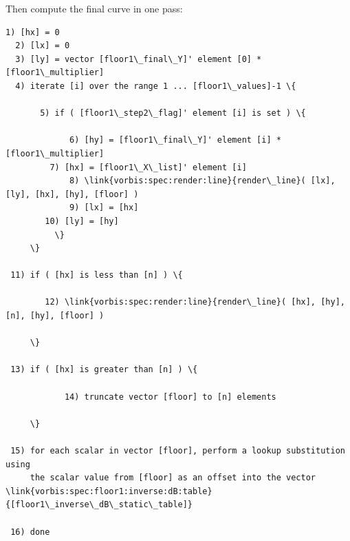 \begin{description}
Then compute the final curve in one pass:

\begin{Verbatim}[commandchars=\\\{\}]
  1) [hx] = 0
  2) [lx] = 0
  3) [ly] = vector [floor1\_final\_Y]' element [0] * [floor1\_multiplier]
  4) iterate [i] over the range 1 ... [floor1\_values]-1 \{

       5) if ( [floor1\_step2\_flag]' element [i] is set ) \{

             6) [hy] = [floor1\_final\_Y]' element [i] * [floor1\_multiplier]
	     7) [hx] = [floor1\_X\_list]' element [i]
             8) \link{vorbis:spec:render:line}{render\_line}( [lx], [ly], [hx], [hy], [floor] )
             9) [lx] = [hx]
	    10) [ly] = [hy]
          \}
     \}

 11) if ( [hx] is less than [n] ) \{

        12) \link{vorbis:spec:render:line}{render\_line}( [hx], [hy], [n], [hy], [floor] )

     \}

 13) if ( [hx] is greater than [n] ) \{

            14) truncate vector [floor] to [n] elements

     \}

 15) for each scalar in vector [floor], perform a lookup substitution using
     the scalar value from [floor] as an offset into the vector \link{vorbis:spec:floor1:inverse:dB:table}{[floor1\_inverse\_dB\_static\_table]}

 16) done

\end{Verbatim}

\end{description}
